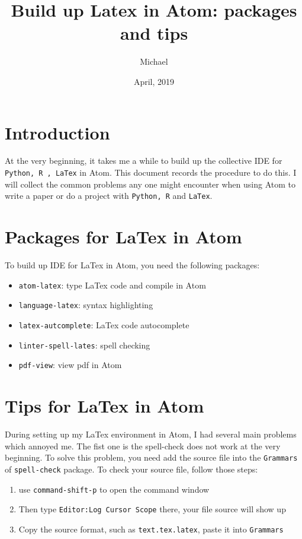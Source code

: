 \documentclass[12pt]{article}
\theoremstyle{definition}
\numberwithin{equation}{section}
\numberwithin{figure}{section}
\numberwithin{table}{section}
\begin{document}
\title{Build up Latex in Atom: packages and tips }
\author{Michael}
\date{April, 2019}


\maketitle  %


\section{Introduction}

At the very beginning, it takes me a while to build up the collective IDE for \texttt{Python, R , LaTex} in Atom. This document records the procedure to do this. I will collect the common problems any one might encounter when using Atom to write a paper or do a project with \texttt{Python, R} and \texttt{LaTex}.


\section{Packages for LaTex in Atom}

To build up IDE for LaTex in Atom, you need the following packages:
\begin{itemize}
  \item \texttt{atom-latex}: type LaTex code and compile in Atom
  \item \texttt{language-latex}: syntax highlighting
  \item \texttt{latex-autcomplete}: LaTex code autocomplete
  \item \texttt{linter-spell-lates}: spell checking
  \item \texttt{pdf-view}: view pdf in Atom
\end{itemize}

\section{Tips for LaTex in Atom}

During setting up my LaTex environment in Atom, I had several main problems which annoyed me. The fist one is the spell-check does not work at the very beginning. To solve this problem, you need add the source file into the \texttt{Grammars} of \texttt{spell-check} package. To check your source file, follow those steps:
\begin{enumerate}
  \item use \colorbox{cmd}{\texttt{command-shift-p}} to open the command window
  \item Then type \colorbox{cmd}{\texttt{Editor:Log Cursor Scope}} there, your file source will show up
  \item Copy the source format, such as \colorbox{cmd}{\texttt{text.tex.latex}}, paste it into \colorbox{cmd}{\texttt{Grammars}}
\end{enumerate}
\end{document}
